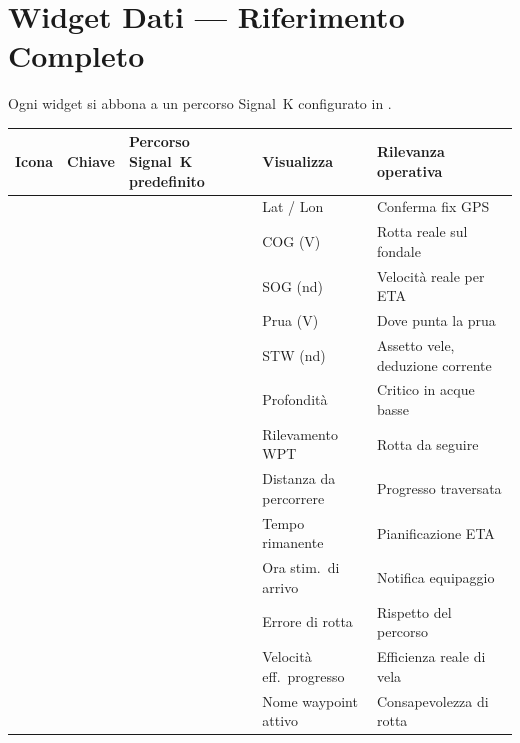 \section{Widget Dati --- Riferimento Completo}

Ogni widget si abbona a un percorso Signal~K configurato in
.

\begin{longtable}{C{1.4cm}C{1.1cm}L{4.4cm}L{3.0cm}L{3.8cm}}
\toprule
{}
\color{white}\sffamily\bfseries Icona &
\color{white}\sffamily\bfseries Chiave &
\color{white}\sffamily\bfseries Percorso Signal~K predefinito &
\color{white}\sffamily\bfseries Visualizza &
\color{white}\sffamily\bfseries Rilevanza operativa \\
\midrule
{} &  &                               & Lat / Lon             & Conferma fix GPS \\
      &  &                   & COG (\textdegree{}V)  & Rotta reale sul fondale \\
      &  &                        & SOG (nd)              & Velocità reale per ETA \\
      &  &                            & Prua (\textdegree{}V) & Dove punta la prua \\
      &  &                      & STW (nd)              & Assetto vele, deduzione corrente \\
      &  &                 & Profondità            & Critico in acque basse \\
      &  &          & Rilevamento WPT       & Rotta da seguire \\
      &  &             & Distanza da percorrere & Progresso traversata \\
      &  &             & Tempo rimanente       & Pianificazione ETA \\
      &  &  & Ora stim.\ di arrivo & Notifica equipaggio \\
      &  &      & Errore di rotta       & Rispetto del percorso \\
      &  &                      & Velocità eff.\ progresso & Efficienza reale di vela \\
      &  &                       & Nome waypoint attivo  & Consapevolezza di rotta \\
\bottomrule
\end{longtable}

